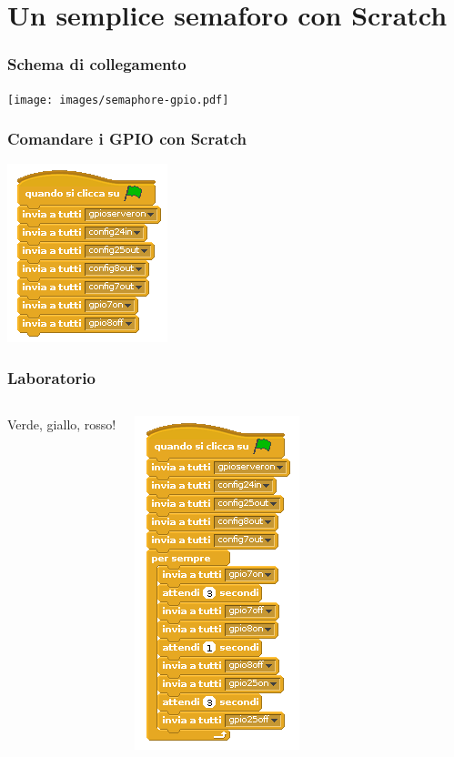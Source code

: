 \documentclass[xetex,table]{beamer}
\begin{document}
\section{Un semplice semaforo con Scratch}

\begin{frame}
  \frametitle{Schema di collegamento}
  \begin{center}
    \texttt{[image: images/semaphore-gpio.pdf]}
  \end{center}
\end{frame}

\begin{frame}
  \frametitle{Comandare i GPIO con Scratch}
  \begin{center}
    \includegraphics[height=0.8\textheight]{images/sketch-gpioserver.png}
  \end{center}
\end{frame}

\begin{frame}
  \frametitle{Laboratorio}
  \begin{columns}
    \begin{center}
      \LARGE Verde, giallo, rosso!
    \end{center}
    \includegraphics[height=0.8\textheight]{images/sketch-semaphore.png}
  \end{columns}
\end{frame}
\end{document}
